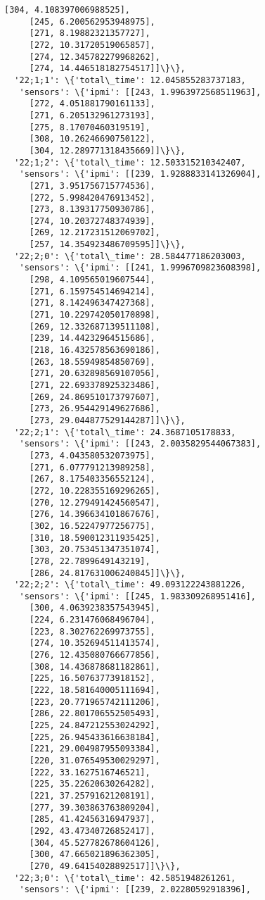 \documentclass[11pt]{article}
\begin{document}
\begin{tcolorbox}[breakable, size=fbox, boxrule=.5pt, pad at break*=1mm, opacityfill=0]
\begin{Verbatim}[commandchars=\\\{\}]
     [304, 4.108397006988525],
     [245, 6.200562953948975],
     [271, 8.19882321357727],
     [272, 10.31720519065857],
     [274, 12.345782279968262],
     [274, 14.446518182754517]]\}\},
  '22;1;1': \{'total\_time': 12.045855283737183,
   'sensors': \{'ipmi': [[243, 1.9963972568511963],
     [272, 4.051881790161133],
     [271, 6.205132961273193],
     [275, 8.17070460319519],
     [308, 10.26246690750122],
     [304, 12.289771318435669]]\}\},
  '22;1;2': \{'total\_time': 12.503315210342407,
   'sensors': \{'ipmi': [[239, 1.9288833141326904],
     [271, 3.951756715774536],
     [272, 5.998420476913452],
     [273, 8.139317750930786],
     [274, 10.20372748374939],
     [269, 12.217231512069702],
     [257, 14.354923486709595]]\}\},
  '22;2;0': \{'total\_time': 28.584477186203003,
   'sensors': \{'ipmi': [[241, 1.9996709823608398],
     [298, 4.109565019607544],
     [271, 6.159754514694214],
     [271, 8.142496347427368],
     [271, 10.229742050170898],
     [269, 12.332687139511108],
     [239, 14.44232964515686],
     [218, 16.432578563690186],
     [263, 18.55949854850769],
     [271, 20.632898569107056],
     [271, 22.693378925323486],
     [269, 24.869510173797607],
     [273, 26.954429149627686],
     [273, 29.044877529144287]]\}\},
  '22;2;1': \{'total\_time': 24.3687105178833,
   'sensors': \{'ipmi': [[243, 2.0035829544067383],
     [273, 4.043580532073975],
     [271, 6.077791213989258],
     [267, 8.175403356552124],
     [272, 10.228355169296265],
     [270, 12.279491424560547],
     [276, 14.396634101867676],
     [302, 16.52247977256775],
     [310, 18.590012311935425],
     [303, 20.753451347351074],
     [278, 22.7899649143219],
     [286, 24.817631006240845]]\}\},
  '22;2;2': \{'total\_time': 49.093122243881226,
   'sensors': \{'ipmi': [[245, 1.983309268951416],
     [300, 4.0639238357543945],
     [224, 6.231476068496704],
     [223, 8.302762269973755],
     [274, 10.352694511413574],
     [276, 12.435080766677856],
     [308, 14.436878681182861],
     [225, 16.50763773918152],
     [222, 18.581640005111694],
     [223, 20.771965742111206],
     [286, 22.801706552505493],
     [225, 24.847212553024292],
     [225, 26.945433616638184],
     [221, 29.004987955093384],
     [220, 31.076549530029297],
     [222, 33.1627516746521],
     [225, 35.22620630264282],
     [221, 37.25791621208191],
     [277, 39.303863763809204],
     [285, 41.42456316947937],
     [292, 43.47340726852417],
     [304, 45.527782678604126],
     [300, 47.665021896362305],
     [270, 49.64154028892517]]\}\},
  '22;3;0': \{'total\_time': 42.5851948261261,
   'sensors': \{'ipmi': [[239, 2.02280592918396],

\end{Verbatim}
\end{tcolorbox}
\end{document}
